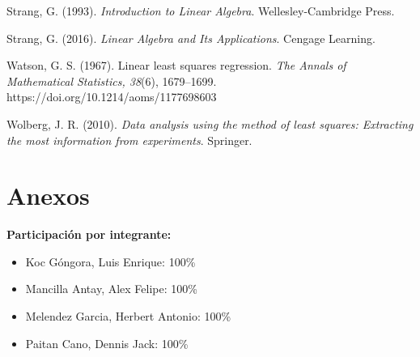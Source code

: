 \documentclass[12pt]{article}
\begin{document}
        \hangindent=0.5in  Strang, G. (1993). \textit{Introduction to Linear Algebra}. Wellesley-Cambridge Press.\par
        \hangindent=0.5in  Strang, G. (2016). \textit{Linear Algebra and Its Applications}. Cengage Learning.\par
        \hangindent=0.5in  Watson, G. S. (1967). Linear least squares regression. \textit{The Annals of Mathematical Statistics, 38}(6), 1679–1699. https://doi.org/10.1214/aoms/1177698603\par
        \hangindent=0.5in  Wolberg, J. R. (2010). \textit{Data analysis using the method of least squares: Extracting the most information from experiments}. Springer.\par
        
        \newpage
        \section*{Anexos}
        \textbf{Participación por integrante:}
        \begin{itemize}
                \item Koc Góngora, Luis Enrique: 100\%
                \item Mancilla Antay, Alex Felipe: 100\%
                \item Melendez Garcia, Herbert Antonio: 100\%
                \item Paitan Cano, Dennis Jack: 100\%
        \end{itemize}
        
\end{document}
